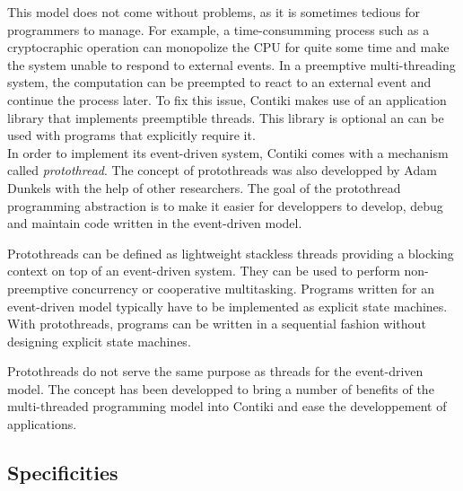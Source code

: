 This model does not come without problems, as it is sometimes tedious for programmers to manage.
For example, a time-consumming process such as a cryptocraphic operation can monopolize the CPU for quite some time 
    and make the system unable to respond to external events. 
In a preemptive multi-threading system, the computation can be preempted to react to an external event 
    and continue the process later.
To fix this issue, Contiki makes use of an application library that implements preemptible threads.
This library is optional an can be used with programs that explicitly require it.\\

In order to implement its event-driven system, Contiki comes with a mechanism called \textit{protothread}.
The concept of protothreads was also developped by Adam Dunkels with the help of other researchers.
The goal of the protothread programming abstraction is to make it easier for developpers to develop, debug and maintain code written in the event-driven model.

Protothreads can be defined as lightweight stackless threads providing a blocking context on top of an event-driven system.
They can be used to perform non-preemptive concurrency or cooperative multitasking.
Programs written for an event-driven model typically have to be implemented as explicit state machines.
With protothreads, programs can be written in a sequential fashion without designing explicit state machines.

Protothreads do not serve the same purpose as threads for the event-driven model.
The concept has been developped to bring a number of benefits of the multi-threaded programming model into Contiki
    and ease the developpement of applications.\\



\subsection{Specificities}
\paragraph{}
